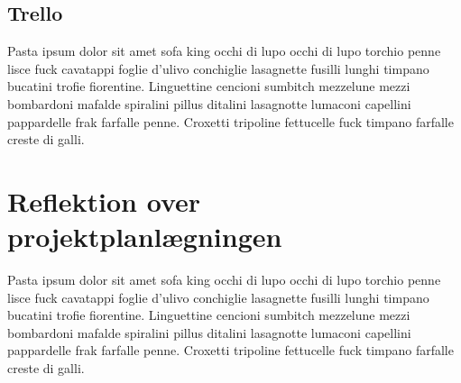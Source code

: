 \subsection{Trello}
Pasta ipsum dolor sit amet sofa king occhi di lupo occhi di lupo torchio penne lisce fuck cavatappi foglie d'ulivo conchiglie lasagnette fusilli lunghi timpano bucatini trofie fiorentine. Linguettine cencioni sumbitch mezzelune mezzi bombardoni mafalde spiralini pillus ditalini lasagnotte lumaconi capellini pappardelle frak farfalle penne. Croxetti tripoline fettucelle fuck timpano farfalle creste di galli.

\section{Reflektion over projektplanlægningen}
Pasta ipsum dolor sit amet sofa king occhi di lupo occhi di lupo torchio penne lisce fuck cavatappi foglie d'ulivo conchiglie lasagnette fusilli lunghi timpano bucatini trofie fiorentine. Linguettine cencioni sumbitch mezzelune mezzi bombardoni mafalde spiralini pillus ditalini lasagnotte lumaconi capellini pappardelle frak farfalle penne. Croxetti tripoline fettucelle fuck timpano farfalle creste di galli.